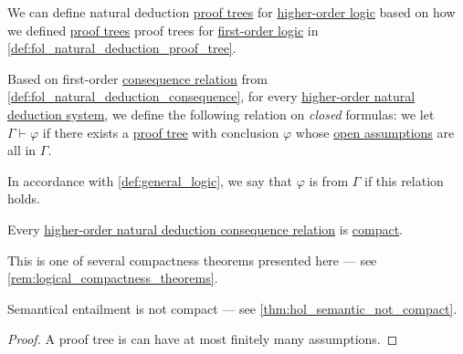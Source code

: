 \begin{definition}\label{def:hol_natural_deduction_proof_tree}
  We can define natural deduction \hyperref[def:proof_tree]{proof trees} for \hyperref[def:higher_order_logic]{higher-order logic} based on how we defined \hyperref[def:proof_tree]{proof trees} proof trees for \hyperref[def:first_order_logic]{first-order logic} in \cref{def:fol_natural_deduction_proof_tree}.
\end{definition}

\begin{definition}\label{def:hol_natural_deduction_consequence}\mimprovised
  Based on first-order \hyperref[def:consequence_relation]{consequence relation} from \cref{def:fol_natural_deduction_consequence}, for every \hyperref[def:hol_natural_deduction_system]{higher-order natural deduction system}, we define the following relation on \emph{closed} formulas: we let \( \Gamma \vdash \varphi \) if there exists a \hyperref[def:hol_natural_deduction_proof_tree]{proof tree} with conclusion \( \varphi \) whose \hyperref[def:propositional_natural_deduction_proof_tree/open_assumptions]{open assumptions} are all in \( \Gamma \).

  In accordance with \cref{def:general_logic}, we say that \( \varphi \) is  from \( \Gamma \) if this relation holds.
\end{definition}

\begin{proposition}\label{thm:hol_natural_deduction_derivation_compact}
  Every \hyperref[def:hol_natural_deduction_consequence]{higher-order natural deduction consequence relation} is \hyperref[def:consequence_relation/compactness]{compact}.
\end{proposition}
\begin{comments}
  \item This is one of several compactness theorems presented here --- see \cref{rem:logical_compactness_theorems}.
  \item Semantical entailment is not compact --- see \cref{thm:hol_semantic_not_compact}.
\end{comments}
\begin{proof}
  A proof tree is can have at most finitely many assumptions.
\end{proof}

